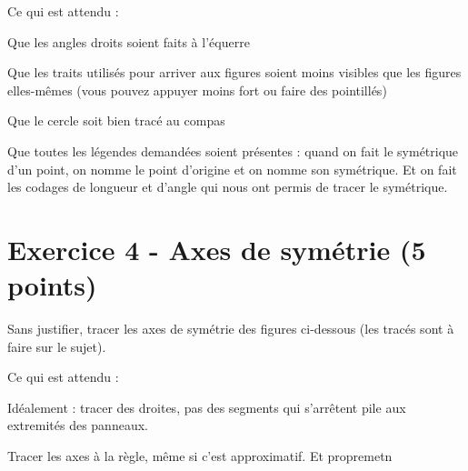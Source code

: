 \documentclass[answers]{exam}
\begin{document}
\begin{solution}
      \begin{Indication}

Ce qui est attendu : 
\begin{compactitem}
\item Que les angles droits soient faits à l'équerre
\item Que les traits utilisés pour arriver aux figures soient moins visibles que les figures elles-mêmes (vous pouvez appuyer moins fort ou faire des pointillés)
\item Que le cercle soit bien tracé au compas
\item Que toutes les légendes demandées soient présentes : quand on fait le symétrique d'un point, on nomme le point d'origine et on nomme son symétrique. Et on fait les codages de longueur et d'angle qui nous ont permis de tracer le symétrique.
\item {}
\item {}
\end{compactitem}

      \end{Indication}


\end{solution}

\section*{Exercice 4 - Axes de symétrie (5 points)}




\begin{questions}
  \question[5] Sans justifier, tracer les axes de symétrie des figures ci-dessous (les tracés sont à faire sur le sujet).

\end{questions}

\begin{solution}
  
\begin{Indication}

Ce qui est attendu : 
\begin{compactitem}
\item Idéalement : tracer des droites, pas des segments qui s'arrêtent pile aux extremités des panneaux.
\item Tracer les axes à la règle, même si c'est approximatif. Et propremetn
\end{compactitem}

\end{Indication}

\end{solution}
\end{document}
